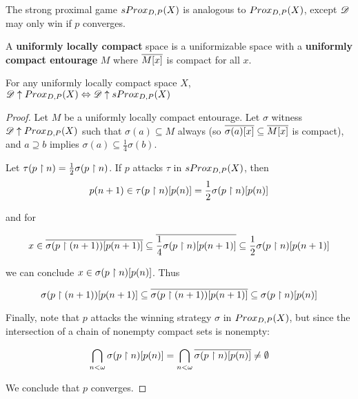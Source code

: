 \newpage

\begin{definition}
  The strong proximal game $sProx_{D,P}(X)$ is analogous to $Prox_{D,P}(X)$, except $\mathscr{D}$ may only win if $p$ converges.
\end{definition}

\begin{definition}
  A \textbf{uniformly locally compact} space is a uniformizable space with a \textbf{uniformly compact entourage} $M$ where $\overline{M[x]}$ is compact for all $x$.
\end{definition}

\begin{theorem}
  For any uniformly locally compact space $X$,
      $\mathscr{D}\uparrow Prox_{D,P}(X) \Leftrightarrow \mathscr{D}\uparrow sProx_{D,P}(X)$
\end{theorem}

\begin{proof}
  Let $M$ be a uniformly locally compact entourage. Let $\sigma$ witness $\mathscr{D}\uparrow Prox_{D,P}(X)$ such that $\sigma(a)\subseteq M$ always (so $\overline{\sigma(a)[x]}\subseteq\overline{M[x]}$ is compact), and $a\supseteq b$  implies $\sigma(a)\subseteq\frac{1}{4}\sigma(b)$.

  Let $\tau(p\restriction n)=\frac{1}{2}\sigma(p\restriction n)$. If $p$ attacks $\tau$ in $sProx_{D,P}(X)$, then
    \[
      p(n+1)
        \in
      \tau(p\restriction n)[p(n)]
        =
      \frac{1}{2}\sigma(p\restriction n)[p(n)]
    \]

    and for

    \[
      x
        \in
      \overline{\sigma(p\restriction (n+1))[p(n+1)]}
        \subseteq
      \overline{\frac{1}{4}\sigma(p\restriction n)[p(n+1)]}
        \subseteq
      \frac{1}{2}\sigma(p\restriction n)[p(n+1)]
    \]

  we can conclude $x\in\sigma(p\restriction n)[p(n)]$. Thus

    \[
      \sigma(p\restriction (n+1))[p(n+1)]
        \subseteq
      \overline{\sigma(p\restriction (n+1))[p(n+1)]}
        \subseteq
      \sigma(p\restriction n)[p(n)]
    \]

  Finally, note that $p$ attacks the winning strategy $\sigma$ in $Prox_{D,P}(X)$, but since the intersection of a chain of nonempty compact sets is nonempty:

    \[
      \bigcap_{n<\omega} \sigma(p\restriction n)[p(n)]
        =
      \bigcap_{n<\omega} \overline{\sigma(p\restriction n)[p(n)]}
        \not=
      \emptyset
    \]

  We conclude that $p$ converges.
\end{proof}

